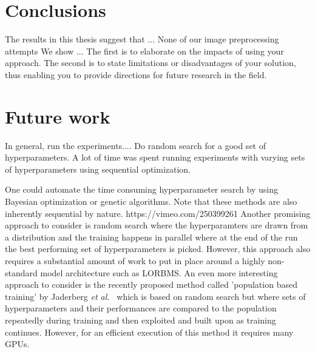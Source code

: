 \documentclass[12pt,a4paper]{article}
\begin{document}
\section{Conclusions}\label{sec:conclusion}
The results in this thesis suggest that ...
None of our image preprocessing attempts
We show ...
The first is
to elaborate on the impacts of using your approach. The
second is to state limitations or disadvantages of your solution,
thus enabling you to provide directions for future
research in the field.


\section{Future work}
In general, run the experiments.... Do random search for a good set of hyperparameters. A lot of time was spent running experiments with varying sets of hyperparameters using sequential optimization.

\par One could automate the time consuming hyperparameter search by using Bayesian optimization or genetic algorithms. Note that these methods are also inherently sequential by nature. https://vimeo.com/250399261
Another promising approach to consider is random search where the hyperparamters are drawn from a distribution and the training happens in parallel where at the end of the run the best performing set of hyperparameters is picked. However, this approach also requires a substantial amount of work to put in place around a highly non-standard model architecture such as LORBMS. An even more interesting approach to consider is the recently proposed method called 'population based training' by Jaderberg \textit{et al.}~\cite{PopBasedTraining} which is based on random search but where sets of hyperparameters and their performances are compared to the population repeatedly during training and then exploited and built upon as training continues. However, for an efficient execution of this method it requires many GPUs. 
\end{document}
